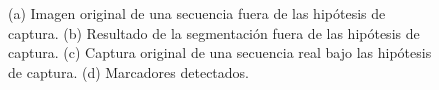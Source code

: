 \begin{figure}[ht!]
        \hspace{4.9 mm}
      \caption{%
       {(a)} Imagen original de una secuencia fuera de las hipótesis de captura. 
       (b) Resultado de la segmentación fuera de las hipótesis de captura.
       (c) Captura original de una secuencia real bajo las hipótesis de captura.
       (d) Marcadores detectados.}  
      \label{ejemploabelumbr2}
\end{figure}
